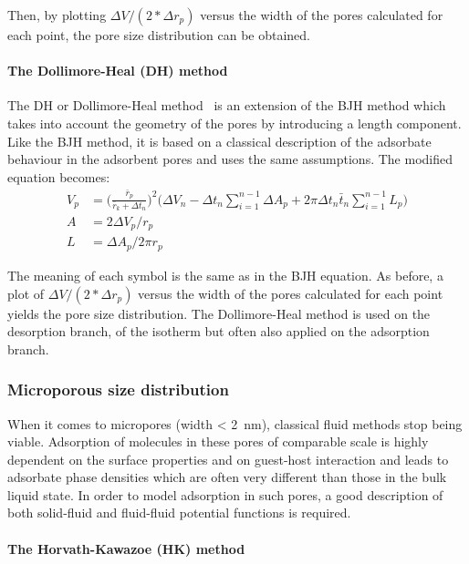 Then, by plotting \(\Delta V / (2*\Delta r_p)\) versus the width
of the pores calculated for each point, the pore size distribution
can be obtained.

\paragraph{The Dollimore-Heal (DH) method}

The \gls{DH} or Dollimore-Heal
method~\cite{dollimorePoresizeDistributionTypical1970}
is an extension of the \gls{BJH} method which takes into account the
geometry of the pores by introducing a length component.
Like the \gls{BJH} method, it is based on a classical description of
the adsorbate behaviour in the adsorbent pores and uses the
same assumptions. The modified equation becomes:
%
\begin{align}
	V_p & = \Big(\frac{\bar{r}_p}{\bar{r}_k + \Delta t_n}\Big)^2
	\Big(\Delta V_n - \Delta t_n \sum_{i=1}^{n-1} \Delta A_p
	+ 2 \pi \Delta t_n \bar{t}_n \sum_{i=1}^{n-1} L_p\Big)       \\
	A   & = 2 \Delta V_p / r_p                                   \\
	L   & = \Delta A_p / 2 \pi r_p
\end{align}

The meaning of each symbol is the same as in the \gls{BJH} equation.
As before, a plot of \(\Delta V/(2*\Delta r_p)\) versus the width of
the pores calculated for each point yields the pore size distribution.
The Dollimore-Heal method is used on the desorption branch,
of the isotherm but often also applied on the adsorption branch.

\subsubsection{Microporous size distribution}

When it comes to micropores (width \SI{< 2}{\nano\metre}), classical
fluid methods stop being viable. Adsorption of molecules in these pores
of comparable scale is highly dependent on the surface properties and
on guest-host interaction and leads to adsorbate phase densities
which are often very different than those in the bulk liquid state.
In order to model adsorption in such pores, a good description of
both solid-fluid and fluid-fluid potential functions is required.

\paragraph{The Horvath-Kawazoe (HK) method}

